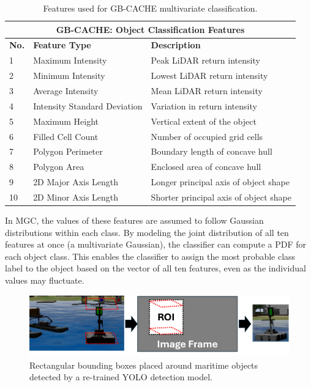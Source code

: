 \documentclass{erauthesis}
\begin{document}
\begin{table}[htbp]
\centering
\begin{tabular}{lll}
\hline
\multicolumn{3}{c}{GB-CACHE: Object Classification Features}\\
\hline
\hline
\textbf{No.} & \textbf{Feature Type} & \textbf{Description} \\ 
\hline
1 & Maximum Intensity & Peak LiDAR return intensity \\
2 & Minimum Intensity & Lowest LiDAR return intensity \\
3 & Average Intensity & Mean LiDAR return intensity \\
4 & Intensity Standard Deviation & Variation in return intensity \\
5 & Maximum Height & Vertical extent of the object \\
6 & Filled Cell Count & Number of occupied grid cells \\
7 & Polygon Perimeter & Boundary length of concave hull \\
8 & Polygon Area & Enclosed area of concave hull \\
9 & 2D Major Axis Length & Longer principal axis of object shape \\
10 & 2D Minor Axis Length & Shorter principal axis of object shape \\
\hline
\end{tabular}
\caption{Features used for GB-CACHE multivariate classification.}
\label{tab:gbcache_features}
\end{table}

In \ac{MGC}, the values of these features are assumed to follow Gaussian distributions within each class.
By modeling the joint distribution of all ten features at once (a multivariate Gaussian), the classifier can compute a \acl{PDF} for each object class.
This enables the classifier to assign the most probable class label to the object based on the vector of all ten features, even as the individual values may fluctuate.

\begin{figure}
    \centering
    \includegraphics[width=0.5\linewidth]{Images/roi_capture.png}
    \caption{Rectangular bounding boxes placed around maritime objects detected by a re-trained YOLO detection model.}
    \label{fig:roi_capture}
\end{figure}
\end{document}
